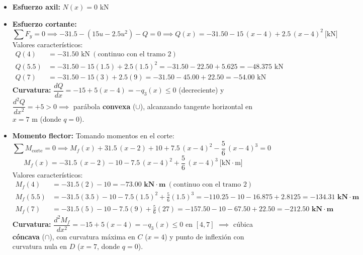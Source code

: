 \begin{itemize}
    \item \textbf{Esfuerzo axil:} $\boxed{N(x) = 0\text{ kN}}$
    \item \textbf{Esfuerzo cortante:}
          \begin{equation}
              \sum F_y = 0 \implies -31.5 - (15u - 2.5u^2) - Q = 0 \implies \boxed{Q(x) = -31.50 - 15\,(x-4) + 2.5\,(x-4)^2 \ \text{[kN]}}
          \end{equation}
          Valores característicos:
          \begin{align*}
              Q(4)   & = -31.50\text{ kN} \ (\text{continuo con el tramo 2})                        \\
              Q(5.5) & = -31.50 - 15(1.5) + 2.5(1.5)^2 = -31.50 - 22.50 + 5.625 = -48.375\text{ kN} \\
              Q(7)   & = -31.50 - 15(3) + 2.5(9) = -31.50 - 45.00 + 22.50 = -54.00\text{ kN}
          \end{align*}
          \textbf{Curvatura:} $\dfrac{dQ}{dx} = -15 + 5(x-4) = -q_3(x) \le 0$ (decreciente) y $\dfrac{d^2Q}{dx^2} = +5 > 0 \implies$ parábola \textbf{convexa} ($\cup$), alcanzando tangente horizontal en $x = 7\text{ m}$ (donde $q = 0$).
    \item \textbf{Momento flector:}
          Tomando momentos en el corte:
          \begin{equation}
              \sum M_{\text{corte}} = 0 \implies M_f(x) + 31.5\,(x-2) + 10 + 7.5\,(x-4)^2 - \frac{5}{6}\,(x-4)^3 = 0
          \end{equation}
          \begin{equation}
              \boxed{M_f(x) = -31.5\,(x-2) - 10 - 7.5\,(x-4)^2 + \frac{5}{6}\,(x-4)^3 \ \text{[kN}\cdot\text{m]}}
          \end{equation}
          Valores característicos:
          \begin{align*}
              M_f(4)   & = -31.5(2) - 10 = \mathbf{-73.00\text{ kN}\cdot\text{m}} \ (\text{continuo con el tramo 2})                                    \\
              M_f(5.5) & = -31.5(3.5) - 10 - 7.5(1.5)^2 + \frac{5}{6}(1.5)^3 = -110.25 - 10 - 16.875 + 2.8125 = \mathbf{-134.31\text{ kN}\cdot\text{m}} \\
              M_f(7)   & = -31.5(5) - 10 - 7.5(9) + \frac{5}{6}(27) = -157.50 - 10 - 67.50 + 22.50 = \mathbf{-212.50\text{ kN}\cdot\text{m}}
          \end{align*}
          \textbf{Curvatura:} $\dfrac{d^2M_f}{dx^2} = -15 + 5(x-4) = -q_3(x) \le 0$ en $[4, 7]$ $\implies$ cúbica \textbf{cóncava} ($\cap$), con curvatura máxima en $C$ ($x=4$) y punto de inflexión con curvatura nula en $D$ ($x=7$, donde $q=0$).
\end{itemize}

